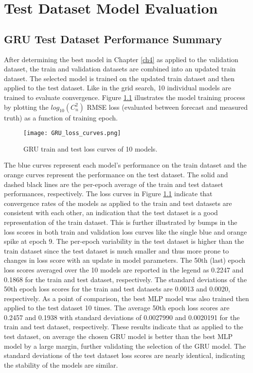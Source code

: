 \chapter{Test Dataset Model Evaluation}
\label{ch5}

\section{GRU Test Dataset Performance Summary}
After determining the best model in Chapter \ref{ch4} as applied to the validation dataset, the train and validation datasets are combined into an updated train dataset. The selected model is trained on the updated train dataset and then applied to the test dataset. Like in the grid search, 10 individual models are trained to evaluate convergence. Figure \ref{fig:GRU_train_test_loss_curves} illustrates the model training process by plotting the $log_{10}(C_{n}^{2})$ RMSE loss (evaluated between forecast and measured truth) as a function of training epoch.
\begin{figure}[h!]
	\centering
	\texttt{[image: GRU\_loss\_curves.png]}
	\caption{GRU train and test loss curves of 10 models.}
	\label{fig:GRU_train_test_loss_curves}
\end{figure}
The blue curves represent each model's performance on the train dataset and the orange curves represent the performance on the test dataset. The solid and dashed black lines are the per-epoch average of the train and test dataset performances, respectively. The loss curves in Figure \ref{fig:GRU_train_test_loss_curves} indicate that convergence rates of the models as applied to the train and test datasets are consistent with each other, an indication that the test dataset is a good representation of the train dataset. This is further illustrated by bumps in the loss scores in both train and validation loss curves like the single blue and orange spike at epoch 9. The per-epoch variability in the test dataset is higher than the train dataset since the test dataset is much smaller and thus more prone to changes in loss score with an update in model parameters. The 50th (last) epoch loss scores averaged over the 10 models are reported in the legend as 0.2247 and 0.1868 for the train and test dataset, respectively. The standard deviations of the 50th epoch loss scores for the train and test datasets are 0.0013 and 0.0020, respectively. As a point of comparison, the best MLP model was also trained then applied to the test dataset 10 times. The average 50th epoch loss scores are 0.2457 and 0.1938 with standard deviations of 0.0027990 and 0.0020191 for the train and test dataset, respectively. These results indicate that as applied to the test dataset, on average the chosen GRU model is better than the best MLP model by a large margin, further validating the selection of the GRU model. The standard deviations of the test dataset loss scores are nearly identical, indicating the stability of the models are similar.

